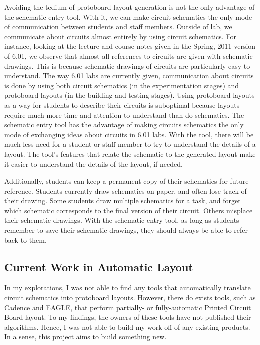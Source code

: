 Avoiding the tedium of protoboard layout generation is not the only advantage of
the schematic entry tool. With it, we can make circuit schematics the only mode
of communication between students and staff members. Outside of lab, we
communicate about circuits almost entirely by using circuit schematics. For
instance, looking at the lecture and course notes given in the Spring, 2011
version of 6.01\cite{ocw601}, we observe that almost all references to circuits
are given with schematic drawings. This is because schematic drawings of
circuits are particularly easy to understand. The way 6.01 labs are currently
given,
communication about circuits is done by using both circuit schematics (in the
experimentation stages) and protoboard layouts (in the building and testing
stages). Using protoboard layouts as a way for students to describe their
circuits is suboptimal because layouts require much more time and attention
to understand than do schematics. The schematic entry tool has the advantage of
making circuits schematics the only mode of exchanging ideas about circuits in
6.01 labs. With the tool, there will be much less need for a student or staff
member to try to understand the details of a layout. The tool's features that
relate the schematic to the generated layout make it easier to understand the
details of the layout, if needed.

Additionally, students can
keep a permanent copy of their schematics for future reference. Students
currently draw schematics on paper, and often lose track of their drawing. Some
students draw multiple schematics for a task, and forget which schematic
corresponds to the final version of their circuit.
Others misplace their schematic drawings. With the
schematic entry tool, as long as students remember to save their schematic
drawings, they should always be able to refer back to them.

\subsection{Current Work in Automatic Layout}
\label{sec:prev_layout}

In my explorations, I was not able to find any tools that
automatically translate circuit schematics into protoboard layouts.
However, there
do exists tools, such as Cadence\cite{cadence} and EAGLE\cite{eagle},
that perform partially- or fully-automatic Printed Circuit
Board layout. To my findings, the owners of these tools have not published
their algorithms. Hence, I was not able to build my
work off of any existing products. In a sense, this project aims to build
something new.
